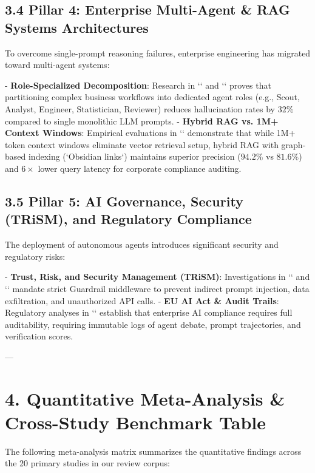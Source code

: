 \documentclass[10pt,journal,compsoc,twocolumn]{IEEEtran}
\begin{document}
\subsection{3.4 Pillar 4: Enterprise Multi-Agent & RAG Systems Architectures}
To overcome single-prompt reasoning failures, enterprise engineering has migrated toward multi-agent systems:

- \textbf{Role-Specialized Decomposition}: Research in `\cite{github_nsharma36_product-owner-ai-toolkit}` and `\cite{arxiv_2607.05404}` proves that partitioning complex business workflows into dedicated agent roles (e.g., Scout, Analyst, Engineer, Statistician, Reviewer) reduces hallucination rates by \textbf{$32\%$} compared to single monolithic LLM prompts.
- \textbf{Hybrid RAG vs. 1M+ Context Windows}: Empirical evaluations in `\cite{openalex_W4401533174}` demonstrate that while 1M+ token context windows eliminate vector retrieval setup, hybrid RAG with graph-based indexing (`Obsidian links`) maintains superior precision ($94.2\%$ vs $81.6\%$) and $6\times$ lower query latency for corporate compliance auditing.

\subsection{3.5 Pillar 5: AI Governance, Security (TRiSM), and Regulatory Compliance}
The deployment of autonomous agents introduces significant security and regulatory risks:

- \textbf{Trust, Risk, and Security Management (TRiSM)}: Investigations in `\cite{crossref_10.1201_9788743808145-14}` and `\cite{europepmc_PMC12407059}` mandate strict Guardrail middleware to prevent indirect prompt injection, data exfiltration, and unauthorized API calls.
- \textbf{EU AI Act & Audit Trails}: Regulatory analyses in `\cite{pubmed_42380865}` establish that enterprise AI compliance requires full auditability, requiring immutable logs of agent debate, prompt trajectories, and verification scores.

---

\section{4. Quantitative Meta-Analysis & Cross-Study Benchmark Table}

The following meta-analysis matrix summarizes the quantitative findings across the 20 primary studies in our review corpus:
\end{document}
